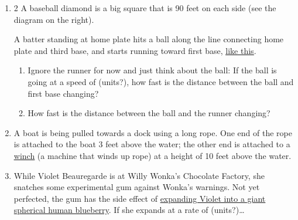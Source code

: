 \begin{enumerate}[leftmargin=0pt]
\item 
\begin{multicols}{2}
A baseball diamond is a big square that is 90 feet on each side (see the diagram on the right). 

A batter standing at home plate hits a ball along the line connecting home plate and third base, and starts running toward first base, 
\underline{\href{https://www.youtube.com/watch?v=3tMKgfJBcAU}{like this}}. 
\vfill
\begin{center}
\end{center}
\end{multicols}
\begin{enumerate}
    \item Ignore the runner for now and just think about the ball: If the ball is going at a speed of \underline{\phantom{??}} (units?),
    how fast is the distance between the ball and first base changing?
    
    \item How fast is the distance between the ball and the runner changing?
\end{enumerate}

\item A boat is being pulled towards a dock using a long rope.  One end of the rope is attached to the boat 3 feet above the water; the other end is attached to a \underline{\href{https://www.dockboxes.com/site/wp-content/uploads/2022/12/8-Winch_CP.jpg}{winch}} (a machine that winds up rope) at a height of 10 feet above the water.

\item While Violet Beauregarde is at Willy Wonka's Chocolate Factory, she snatches some experimental gum against Wonka's warnings. Not yet perfected, the gum has the side effect of \href{https://www.youtube.com/watch?v=8Yqw_f26SvM}{expanding Violet into a giant spherical human blueberry}. If she expands at a rate of \underline{\phantom{??}} (units?)\ldots
\end{enumerate}
